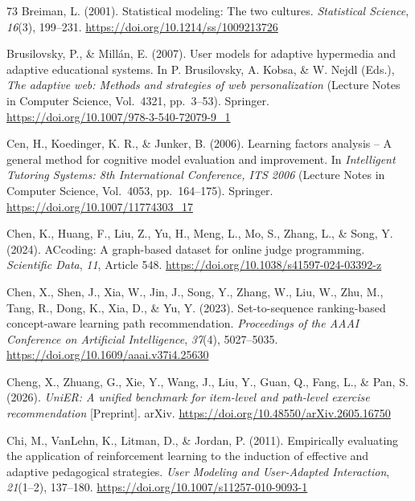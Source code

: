 \documentclass[a4paper,preprint,12pt,authoryear]{elsarticle}
\begin{document}
\begin{thebibliography}{73}
Breiman, L. (2001). Statistical modeling: The two cultures. \textit{Statistical Science}, \textit{16}(3), 199--231. \url{https://doi.org/10.1214/ss/1009213726}

Brusilovsky, P., \& Millán, E. (2007). User models for adaptive hypermedia and adaptive educational systems. In P. Brusilovsky, A. Kobsa, \& W. Nejdl (Eds.), \textit{The adaptive web: Methods and strategies of web personalization} (Lecture Notes in Computer Science, Vol.~4321, pp.~3--53). Springer. \url{https://doi.org/10.1007/978-3-540-72079-9_1}

Cen, H., Koedinger, K. R., \& Junker, B. (2006). Learning factors analysis -- A general method for cognitive model evaluation and improvement. In \textit{Intelligent Tutoring Systems: 8th International Conference, ITS 2006} (Lecture Notes in Computer Science, Vol.~4053, pp.~164--175). Springer. \url{https://doi.org/10.1007/11774303_17}

Chen, K., Huang, F., Liu, Z., Yu, H., Meng, L., Mo, S., Zhang, L., \& Song, Y. (2024). ACcoding: A graph-based dataset for online judge programming. \textit{Scientific Data}, \textit{11}, Article 548. \url{https://doi.org/10.1038/s41597-024-03392-z}

Chen, X., Shen, J., Xia, W., Jin, J., Song, Y., Zhang, W., Liu, W., Zhu, M., Tang, R., Dong, K., Xia, D., \& Yu, Y. (2023). Set-to-sequence ranking-based concept-aware learning path recommendation. \textit{Proceedings of the AAAI Conference on Artificial Intelligence}, \textit{37}(4), 5027--5035. \url{https://doi.org/10.1609/aaai.v37i4.25630}

Cheng, X., Zhuang, G., Xie, Y., Wang, J., Liu, Y., Guan, Q., Fang, L., \& Pan, S. (2026). \textit{UniER: A unified benchmark for item-level and path-level exercise recommendation} [Preprint]. arXiv. \url{https://doi.org/10.48550/arXiv.2605.16750}

Chi, M., VanLehn, K., Litman, D., \& Jordan, P. (2011). Empirically evaluating the application of reinforcement learning to the induction of effective and adaptive pedagogical strategies. \textit{User Modeling and User-Adapted Interaction}, \textit{21}(1--2), 137--180. \url{https://doi.org/10.1007/s11257-010-9093-1}


\end{thebibliography}
\end{document}
